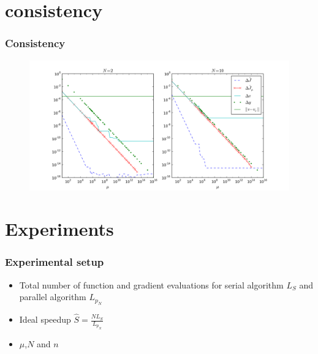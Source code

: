\documentclass{beamer}
\begin{document}
\section{consistency}
\begin{frame}
\frametitle{Consistency}
\begin{figure}[!h]
\centering
\includegraphics[scale=0.4]{consistency1.png}

\end{figure}
\end{frame}
\section{Experiments}
\begin{frame}
\frametitle{Experimental setup}
\begin{itemize}
\item<1->{Total number of function and gradient evaluations for serial algorithm $L_S$ and parallel algorithm $L_{p_N}$}
\item<1->{Ideal speedup $\hat{S}=\frac{N L_S}{L_{p_N}}$}
\item<2->{$\mu$,$N$ and $n$}
\end{itemize}
\end{frame}
\end{document}
